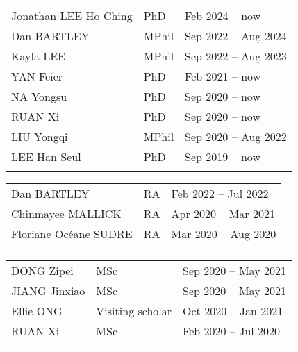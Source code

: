 \documentclass[letterpaper]{article}
\begin{document}
\begin{tabularx}{\textwidth}{XXX}
  Jonathan LEE Ho Ching   & PhD   & Feb 2024 -- now\\
  Dan BARTLEY             & MPhil & Sep 2022 -- Aug 2024\\
  Kayla LEE               & MPhil & Sep 2022 -- Aug 2023\\
  YAN Feier               & PhD   & Feb 2021 -- now\\
  NA Yongsu               & PhD   & Sep 2020 -- now\\
  RUAN Xi                 & PhD   & Sep 2020 -- now\\
  LIU Yongqi              & MPhil & Sep 2020 -- Aug 2022\\
  LEE Han Seul            & PhD   & Sep 2019 -- now\\
  \\
\end{tabularx}

\begin{tabularx}{\textwidth}{XXX}
  Dan BARTLEY             & RA    & Feb 2022 -- Jul 2022\\
  Chinmayee MALLICK       & RA    & Apr 2020 -- Mar 2021\\
  Floriane Oc\'eane SUDRE & RA    & Mar 2020 -- Aug 2020\\
  \\
\end{tabularx}

\begin{tabularx}{\textwidth}{XXX}
  DONG Zipei        & MSc               & Sep 2020 -- May 2021\\
  JIANG Jinxiao     & MSc               & Sep 2020 -- May 2021\\
  Ellie ONG         & Visiting scholar  & Oct 2020 -- Jan 2021\\
  RUAN Xi           & MSc               & Feb 2020 -- Jul 2020\\
  \\
\end{tabularx}
  
\end{document}
